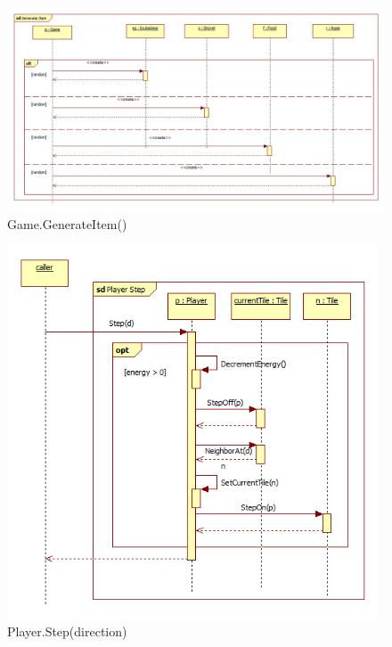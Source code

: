 \begin{figure}[H]
	\begin{center}
		\includegraphics[width=17cm]{chapters/chapter03/seqdiag/Game_generate_item.png}
		\caption{Game.GenerateItem()}
		\label{fig:GameGenerateItem}
	\end{center}
\end{figure}
\begin{figure}[H]
	\begin{center}
		\includegraphics[width=11cm]{chapters/chapter03/seqdiag/Player_Step.png}
		\caption{Player.Step(direction)}
		\label{fig:PlayerStep}
	\end{center}
\end{figure}
